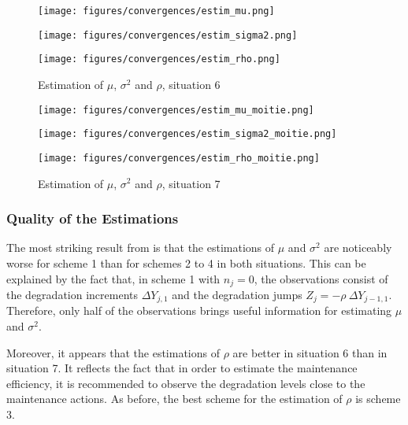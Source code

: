  
 \begin{figure}[h!]
\begin{multicols}{3}
\texttt{[image: figures/convergences/estim\_mu.png]}\\

\columnbreak

\texttt{[image: figures/convergences/estim\_sigma2.png]}\\

\columnbreak

\texttt{[image: figures/convergences/estim\_rho.png]} 
\end{multicols}
\vspace{-6mm}
\caption{Estimation of $\mu$, $\sigma^2$ and $\rho$, situation 6}
\label{fig:convergences}
\end{figure}

\begin{figure}[h!]
\begin{multicols}{3}
\texttt{[image: figures/convergences/estim\_mu\_moitie.png]}\\
\columnbreak

\texttt{[image: figures/convergences/estim\_sigma2\_moitie.png]} \\
\columnbreak

\texttt{[image: figures/convergences/estim\_rho\_moitie.png]} 
\end{multicols}
\vspace{-6mm}
\caption{Estimation of $\mu$, $\sigma^2$ and $\rho$, situation 7}
\label{fig:convergences3}
\end{figure}

\subsubsection{Quality of the Estimations}
The most striking result from  is that the estimations of $\mu$ and $\sigma^2$ are noticeably worse for scheme 1 than for schemes 2 to 4 in both situations.
This can be explained by the fact that, in scheme 1 with $n_j=0$, the observations consist of the degradation increments $\Delta Y_{j,1}$ and the degradation jumps $Z_j=-\rho\ \Delta Y_{j-1,1} $. Therefore, only half of the observations brings useful information for estimating $\mu$ and $\sigma^2$. 

Moreover, it appears that the estimations of $\rho$ are better in situation 6 than in situation 7. It reflects the fact that in order to estimate the maintenance efficiency, it is recommended to observe the degradation levels close to the maintenance actions. As before, the best scheme for the estimation of $\rho$ is scheme 3.

